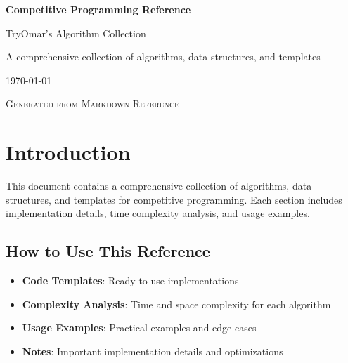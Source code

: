 \documentclass[11pt,a4paper]{article}
\begin{document}
\begin{titlepage}
    \centering
    \vspace*{2cm}
    
    {\Huge\bfseries Competitive Programming Reference\par}
    \vspace{1cm}
    
    {\Large TryOmar's Algorithm Collection\par}
    \vspace{2cm}
    
    {\large A comprehensive collection of algorithms, data structures, and templates\par}
    \vspace{1cm}
    
    {\large \today\par}
    
    \vfill
    
    {\large \textsc{Generated from Markdown Reference}\par}
\end{titlepage}

\tableofcontents
\newpage

\section{Introduction}
This document contains a comprehensive collection of algorithms, data structures, and templates for competitive programming. Each section includes implementation details, time complexity analysis, and usage examples.

\subsection{How to Use This Reference}
\begin{itemize}
    \item \textbf{Code Templates}: Ready-to-use implementations
    \item \textbf{Complexity Analysis}: Time and space complexity for each algorithm
    \item \textbf{Usage Examples}: Practical examples and edge cases
    \item \textbf{Notes}: Important implementation details and optimizations
\end{itemize}

\vspace{1cm}
\end{document}
